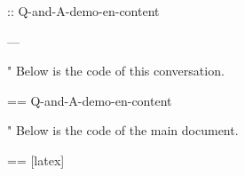 \documentclass[%
  scroll,
]{Q-and-A}
\begin{document}
:: {Q-and-A-demo-en-content}


---

"
  Below is the code of this conversation.

  == {Q-and-A-demo-en-content}

"
  Below is the code of the main document.

  == [latex] {\jobname}
\end{document}
